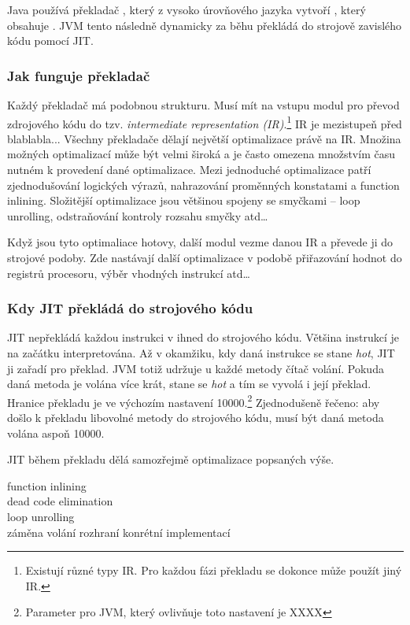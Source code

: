 Java používá překladač \javac{}, který z vysoko úrovňového jazyka vytvoří \classfile{}, který obsahuje \bytecode{}. JVM tento \bytecode{} následně dynamicky za běhu překládá do strojově zavislého kódu pomocí JIT.

\subsubsection{Jak funguje překladač}
Každý překladač má podobnou strukturu. Musí mít na vstupu modul pro převod zdrojového kódu do tzv. \emph{intermediate representation (IR)}.\footnote{Existují různé typy IR. Pro každou fázi překladu se dokonce může použít jiný IR.} IR je mezistupeň před blablabla... Všechny překladače dělají největší optimalizace právě na IR. Množina možných optimalizací může být velmi široká a je často omezena množstvím času nutném k provedení dané optimalizace. Mezi jednoduché optimalizace patří zjednodušování logických výrazů, nahrazování proměnných konstatami a function inlining. Složitější optimalizace jsou většinou spojeny se smyčkami -- loop unrolling, odstraňování kontroly rozsahu smyčky atd\ldots{}

Když jsou tyto optimaliace hotovy, další modul vezme danou IR a převede ji do strojové podoby. Zde nastávají další optimalizace v podobě přiřazování hodnot do registrů procesoru, výběr vhodných instrukcí atd\ldots{}

\subsubsection{Kdy JIT překládá do strojového kódu\label{subsub:whenJIT}}
JIT nepřekládá každou instrukci v \bytecode{} ihned do strojového kódu. Většina instrukcí je na začátku interpretována. Až v okamžiku, kdy daná instrukce se stane \emph{hot}, JIT ji zařadí pro překlad. JVM totiž udržuje u každé metody čítač volání. Pokuda daná metoda je volána více krát, stane se \emph{hot} a tím se vyvolá i její překlad. Hranice překladu je ve výchozím nastavení 10000.\footnote{Parameter pro JVM, který ovlivňuje toto nastavení je XXXX} Zjednodušeně řečeno: aby došlo k překladu libovolné metody do strojového kódu, musí být daná metoda volána aspoň 10000.

JIT během překladu dělá samozřejmě optimalizace popsaných výše.

\begin{description}
\item[function inlining] 
\item[dead code elimination]
\item[loop unrolling]
\item[záměna volání rozhraní konrétní implementací]
\end{description}

